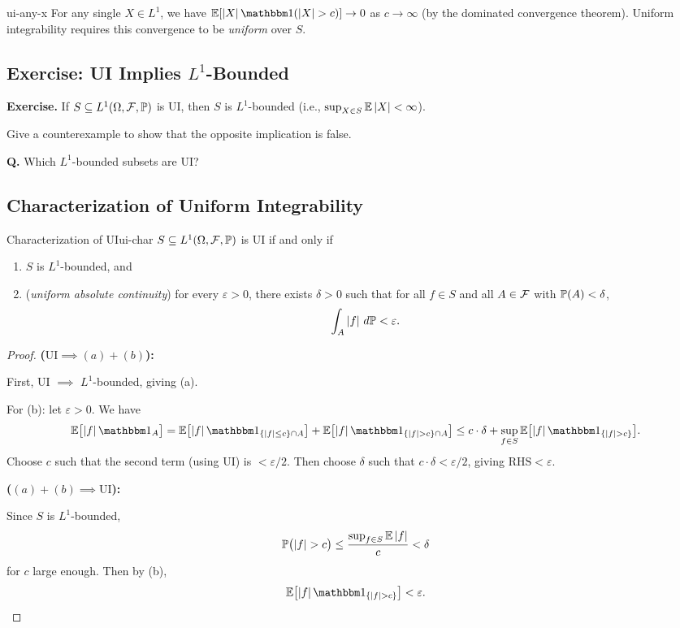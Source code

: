 \begin{remark}{}{ui-any-x}
    For any single $X \in L^1$, we have $\E[\abs{X}\ind(\abs{X} > c)] \to 0$ as $c \to \infty$ (by the dominated convergence theorem). Uniform integrability requires this convergence to be \emph{uniform} over $S$.
\end{remark}

\subsection{Exercise: UI Implies $L^1$-Bounded}

\textbf{Exercise.} If $S \subseteq L^1(\Omega, \mathcal{F}, \mathbb{P})$ is UI, then $S$ is $L^1$-bounded (i.e., $\sup_{X \in S} \mathbb{E}\left|X\right| < \infty$).

Give a counterexample to show that the opposite implication is false.

\textbf{Q.} Which $L^1$-bounded subsets are UI?

\subsection{Characterization of Uniform Integrability}

\begin{lemma}{Characterization of UI}{ui-char}
    $S \subseteq L^1(\Omega, \mathcal{F}, \mathbb{P})$ is UI if and only if
    \begin{enumerate}[label=(\alph*)]
        \item $S$ is $L^1$-bounded, and
        \item (\emph{uniform absolute continuity}) for every $\varepsilon > 0$, there exists $\delta > 0$ such that for all $f \in S$ and all $A \in \mathcal{F}$ with $\mathbb{P}(A) < \delta$,
        \[
            \int_A \left|f\right| \,d\mathbb{P} < \varepsilon.
        \]
    \end{enumerate}
\end{lemma}

\begin{proof}
    \textbf{($\text{UI} \implies (a) + (b)$):}

    First, UI $\implies$ $L^1$-bounded, giving (a).

    For (b): let $\varepsilon > 0$. We have
    \[
        \E\bigl[\abs{f} \ind_A\bigr]
        = \E\bigl[\abs{f} \ind_{\{\abs{f} \leq c\} \cap A}\bigr]
          + \E\bigl[\abs{f} \ind_{\{\abs{f} > c\} \cap A}\bigr]
        \leq c \cdot \delta + \sup_{f \in S} \E\bigl[\abs{f} \ind_{\{\abs{f} > c\}}\bigr].
    \]
    Choose $c$ such that the second term (using UI) is $< \varepsilon/2$. Then choose $\delta$ such that $c \cdot \delta < \varepsilon/2$, giving $\text{RHS} < \varepsilon$.

    \medskip

    \textbf{($(a) + (b) \implies \text{UI}$):}

    Since $S$ is $L^1$-bounded,
    \[
        \mathbb{P}\bigl(\left|f\right| > c\bigr) \leq \frac{\sup_{f \in S} \mathbb{E}\left|f\right|}{c} < \delta
    \]
    for $c$ large enough. Then by (b),
    \[
        \E\bigl[\abs{f} \ind_{\{\abs{f} > c\}}\bigr] < \varepsilon. \qedhere
    \]
\end{proof}

